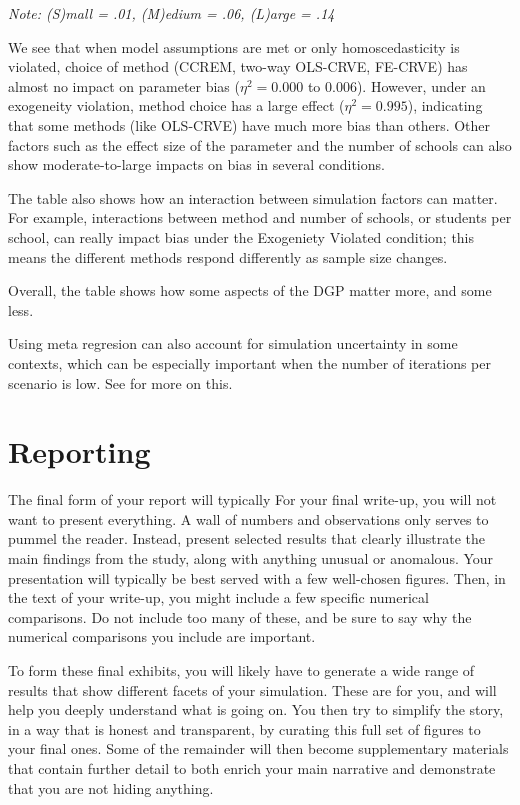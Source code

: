 \documentclass[
]{book}
\begin{document}
\emph{Note: (S)mall = .01, (M)edium = .06, (L)arge = .14}

We see that when model assumptions are met or only homoscedasticity is violated, choice of method (CCREM, two-way OLS-CRVE, FE-CRVE) has almost no impact on parameter bias (\(\eta^2 = 0.000\) to 0.006).
However, under an exogeneity violation, method choice has a large effect (\(\eta^2 = 0.995\)), indicating that some methods (like OLS-CRVE) have much more bias than others.
Other factors such as the effect size of the parameter and the number of schools can also show moderate-to-large impacts on bias in several conditions.

The table also shows how an interaction between simulation factors can matter.
For example, interactions between method and number of schools, or students per school, can really impact bias under the Exogeniety Violated condition; this means the different methods respond differently as sample size changes.

Overall, the table shows how some aspects of the DGP matter more, and some less.

Using meta regresion can also account for simulation uncertainty in some contexts, which can be especially important when the number of iterations per scenario is low.
See \citet{gilbert2024multilevel} for more on this.

\section{Reporting}\label{reporting}

The final form of your report will typically
For your final write-up, you will not want to present everything.
A wall of numbers and observations only serves to pummel the reader.
Instead, present selected results that clearly illustrate the main findings from the study, along with anything unusual or anomalous.
Your presentation will typically be best served with a few well-chosen figures.
Then, in the text of your write-up, you might include a few specific numerical comparisons.
Do not include too many of these, and be sure to say why the numerical comparisons you include are important.

To form these final exhibits, you will likely have to generate a wide range of results that show different facets of your simulation.
These are for you, and will help you deeply understand what is going on.
You then try to simplify the story, in a way that is honest and transparent, by curating this full set of figures to your final ones.
Some of the remainder will then become supplementary materials that contain further detail to both enrich your main narrative and demonstrate that you are not hiding anything.
\end{document}

